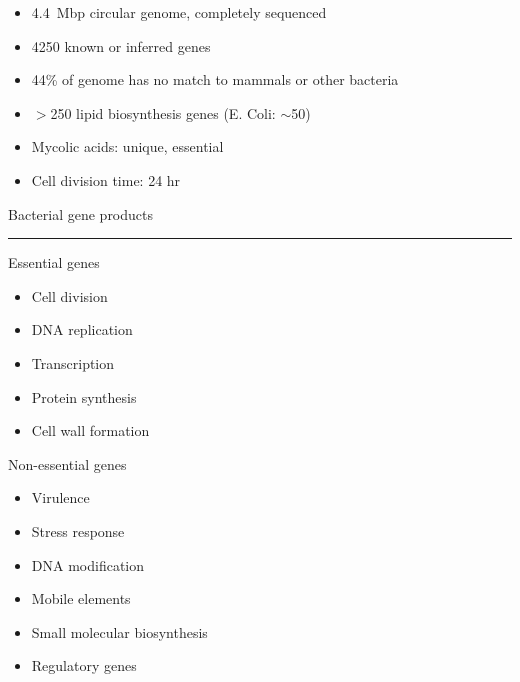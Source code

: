 \documentclass[12pt]{article}
\newcommand{\headsize}{\fontsize{35}{35} \selectfont}
\newcommand{\textsize}{\fontsize{30}{35} \selectfont}
\newcommand{\smallsize}{\fontsize{25}{30} \selectfont}
\newcommand{\headcolor}{\color [cmyk]{0.72,0.67,0.33,0}}
\newcommand{\linecolor}{\color [named]{Thistle}}
\begin{document}
\hfill
\begin{minipage}[t]{9.5in} \begin{itemize}
\setlength{\rightskip}{0pt plus 1fil} %
\setlength{\itemsep}{15pt}

\item 4.4~Mbp circular genome, completely sequenced

\item 4250 known or inferred genes

\item 44\% of genome has no match to mammals or other bacteria

\item $>$250 lipid biosynthesis genes (E. Coli: $\sim$50)

\item Mycolic acids: unique, essential

\item Cell division time: 24 hr

\end{itemize} \end{minipage}


\newpage

\headsize \headcolor
\centerline{Bacterial gene products}
\linecolor \noindent \rule[3mm]{10in}{2mm}

\vspace{5mm}
\smallsize \normalcolor

\begin{minipage}[t]{4.0in} 
{\headcolor \textsize Essential genes}

\vspace{5mm}

\begin{itemize}
\item Cell division
\item DNA replication
\item Transcription
\item Protein synthesis
\item Cell wall formation
\end{itemize} \end{minipage}
\hfill
\begin{minipage}[t]{5.5in} 
{\headcolor \textsize Non-essential genes}

\vspace{5mm}

\begin{itemize}
\item Virulence
\item Stress response
\item DNA modification 
\item Mobile elements
\item Small molecular biosynthesis
\item Regulatory genes
\end{itemize} \end{minipage}
\end{document}
